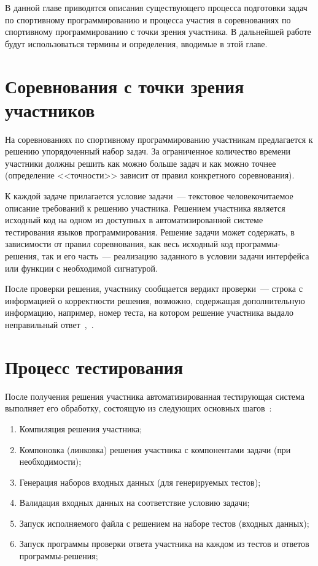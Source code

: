 \documentclass[times,specification,annotation]{style/itmo-student-thesis/itmo-student-thesis}
\begin{document}
В данной главе приводятся описания существующего процесса подготовки задач по спортивному программированию и процесса участия в соревнованиях по спортивному программированию с точки зрения участника. В дальнейшей работе будут использоваться термины и определения, вводимые в этой главе.

\section{Соревнования с точки зрения участников}

На соревнованиях по спортивному программированию участникам предлагается к решению упорядоченный набор задач. За ограниченное количество времени участники должны решить как можно больше задач и как можно точнее (определение <<точности>> зависит от правил конкретного соревнования).

К каждой задаче прилагается условие задачи~--- текстовое человекочитаемое описание требований к решению участника. Решением участника является исходный код на одном из доступных в автоматизированной системе тестирования языков программирования. Решение задачи может содержать, в зависимости от правил соревнования, как весь исходный код программы-решения, так и его часть~--- реализацию заданного в условии задачи интерфейса или функции с необходимой сигнатурой.

После проверки решения, участнику сообщается вердикт проверки~--- строка с информацией о корректности решения, возможно, содержащая дополнительную информацию, например, номер теста, на котором решение участника выдало неправильный ответ~\cite{codeforces-rules},~\cite{nerc-rules}.

\section{Процесс тестирования}

После получения решения участника автоматизированная тестирующая система выполняет его обработку, состоящую из следующих основных шагов~\cite{roi-regionals-requirements}:

\begin{enumerate}
    \item Компиляция решения участника;
    \item Компоновка (линковка) решения участника с компонентами задачи (при необходимости);
    \item Генерация наборов входных данных (для генерируемых тестов);
    \item Валидация входных данных на соответствие условию задачи;
    \item Запуск исполняемого файла с решением на наборе тестов (входных данных);
    \item Запуск программы проверки ответа участника на каждом из тестов и ответов программы-решения;
\end{enumerate}
\end{document}
